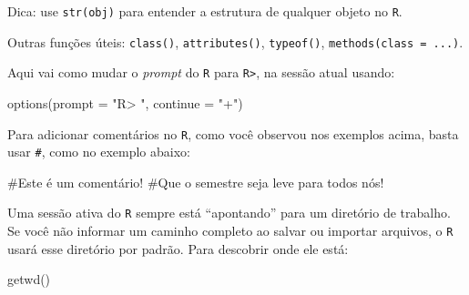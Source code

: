 \documentclass[
  letterpaper,
  DIV=11,
  numbers=noendperiod]{scrreprt}
\newenvironment{Shaded}{\begin{snugshade}}{\end{snugshade}}
\newcommand{\AttributeTok}[1]{\textcolor[rgb]{0.40,0.45,0.13}{#1}}
\newcommand{\CommentTok}[1]{\textcolor[rgb]{0.37,0.37,0.37}{#1}}
\newcommand{\FunctionTok}[1]{\textcolor[rgb]{0.28,0.35,0.67}{#1}}
\newcommand{\NormalTok}[1]{\textcolor[rgb]{0.00,0.23,0.31}{#1}}
\newcommand{\StringTok}[1]{\textcolor[rgb]{0.13,0.47,0.30}{#1}}
\begin{document}
\begin{tcolorbox}[enhanced jigsaw, left=2mm, toprule=.15mm, opacityback=0, title=\textcolor{quarto-callout-tip-color}{\faLightbulb}\hspace{0.5em}{Dica}, leftrule=.75mm, breakable, colbacktitle=quarto-callout-tip-color!10!white, coltitle=black, rightrule=.15mm, bottomtitle=1mm, toptitle=1mm, colframe=quarto-callout-tip-color-frame, colback=white, opacitybacktitle=0.6, bottomrule=.15mm, arc=.35mm, titlerule=0mm]

Dica: use \texttt{str(obj)} para entender a estrutura de qualquer objeto
no \texttt{R}.

Outras funções úteis: \texttt{class()}, \texttt{attributes()},
\texttt{typeof()}, \texttt{methods(class\ =\ ...)}.

\end{tcolorbox}

Aqui vai como mudar o \emph{prompt} do \texttt{R} para
\texttt{R\textgreater{}}, na sessão atual usando:

\begin{Shaded}
\begin{Highlighting}[]
\FunctionTok{options}\NormalTok{(}\AttributeTok{prompt =} \StringTok{"R\textgreater{} "}\NormalTok{, }\AttributeTok{continue =} \StringTok{"+"}\NormalTok{)}
\end{Highlighting}
\end{Shaded}

Para adicionar comentários no \texttt{R}, como você observou nos
exemplos acima, basta usar \texttt{\#}, como no exemplo abaixo:

\begin{Shaded}
\begin{Highlighting}[]
\CommentTok{\#Este é um comentário! }
\CommentTok{\#Que o semestre seja leve para todos nós!}
\end{Highlighting}
\end{Shaded}

Uma sessão ativa do \texttt{R} sempre está ``apontando'' para um
diretório de trabalho. Se você não informar um caminho completo ao
salvar ou importar arquivos, o \texttt{R} usará esse diretório por
padrão. Para descobrir onde ele está:

\begin{Shaded}
\begin{Highlighting}[]
\FunctionTok{getwd}\NormalTok{()}
\end{Highlighting}
\end{Shaded}
\end{document}

